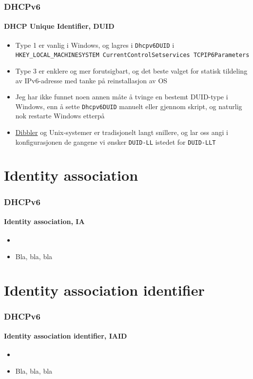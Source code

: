 \begin{frame}%
  \frametitle{DHCPv6}
  \framesubtitle{DHCP Unique Identifier, DUID}
  \pause
  \begin{itemize}[<+->]
  \item Type 1 er vanlig i Windows, og lagres i \texttt{Dhcpv6DUID} i
    \texttt{HKEY\_LOCAL\_MACHINE\Textbackslash SYSTEM\Textbackslash
      CurrentControlSet\Textbackslash services\Textbackslash
      TCPIP6\Textbackslash Parameters}
  \item Type 3 er enklere og mer forutsigbart, og det beste valget for
    statisk tildeling av IPv6-adresse med tanke på reinstallasjon av
    OS
  \item Jeg har ikke funnet noen annen måte å tvinge en bestemt
    DUID-type i Windows, enn å sette \texttt{Dhcpv6DUID} manuelt eller
    gjennom skript, og naturlig nok restarte Windows etterpå
  \item \href{http://klub.com.pl/dhcpv6/}{Dibbler} og Unix-systemer er
    tradisjonelt langt snillere, og lar oss angi i konfigurasjonen de
    gangene vi ønsker \texttt{DUID-LL} istedet for \texttt{DUID-LLT}
  \end{itemize}
\end{frame}

\section{Identity association}
\begin{frame}%
  \frametitle{DHCPv6}
  \framesubtitle{Identity association, IA}
  \pause
  \begin{itemize}[<+->]
  \item {}
  \item Bla, bla, bla
 \end{itemize}
\end{frame}

\section{Identity association identifier}
\begin{frame}%
  \frametitle{DHCPv6}
  \framesubtitle{Identity association identifier, IAID}
  \pause
  \begin{itemize}[<+->]
  \item {}
  \item Bla, bla, bla
 \end{itemize}
\end{frame}

